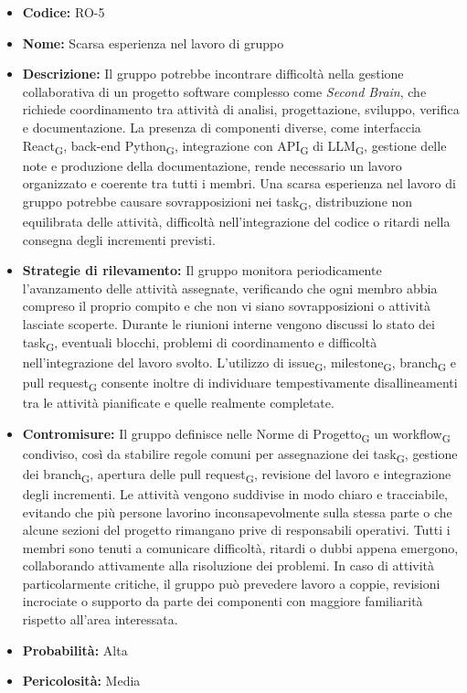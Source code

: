﻿\documentclass[a4paper, 10pt, colorlinks=true, linkcolor=black, urlcolor=blue, citecolor=blue, hidelinks]{article}
\begin{document}
\begin{itemize}
    \item \textbf{Codice:} RO-5

    \item \textbf{Nome:} Scarsa esperienza nel lavoro di gruppo

    \item \textbf{Descrizione:} Il gruppo potrebbe incontrare difficoltà nella gestione collaborativa di un progetto software complesso come \textit{Second Brain}, che richiede coordinamento tra attività di analisi, progettazione, sviluppo, verifica e documentazione. La presenza di componenti diverse, come interfaccia React\textsubscript{G}, back-end Python\textsubscript{G}, integrazione con API\textsubscript{G} di LLM\textsubscript{G}, gestione delle note e produzione della documentazione, rende necessario un lavoro organizzato e coerente tra tutti i membri. Una scarsa esperienza nel lavoro di gruppo potrebbe causare sovrapposizioni nei task\textsubscript{G}, distribuzione non equilibrata delle attività, difficoltà nell'integrazione del codice o ritardi nella consegna degli incrementi previsti.

    \item \textbf{Strategie di rilevamento:} Il gruppo monitora periodicamente l'avanzamento delle attività assegnate, verificando che ogni membro abbia compreso il proprio compito e che non vi siano sovrapposizioni o attività lasciate scoperte. Durante le riunioni interne vengono discussi lo stato dei task\textsubscript{G}, eventuali blocchi, problemi di coordinamento e difficoltà nell'integrazione del lavoro svolto. L'utilizzo di issue\textsubscript{G}, milestone\textsubscript{G}, branch\textsubscript{G} e pull request\textsubscript{G} consente inoltre di individuare tempestivamente disallineamenti tra le attività pianificate e quelle realmente completate.

    \item \textbf{Contromisure:} Il gruppo definisce nelle Norme di Progetto\textsubscript{G} un workflow\textsubscript{G} condiviso, così da stabilire regole comuni per assegnazione dei task\textsubscript{G}, gestione dei branch\textsubscript{G}, apertura delle pull request\textsubscript{G}, revisione del lavoro e integrazione degli incrementi. Le attività vengono suddivise in modo chiaro e tracciabile, evitando che più persone lavorino inconsapevolmente sulla stessa parte o che alcune sezioni del progetto rimangano prive di responsabili operativi. Tutti i membri sono tenuti a comunicare difficoltà, ritardi o dubbi appena emergono, collaborando attivamente alla risoluzione dei problemi. In caso di attività particolarmente critiche, il gruppo può prevedere lavoro a coppie, revisioni incrociate o supporto da parte dei componenti con maggiore familiarità rispetto all'area interessata.

    \item \textbf{Probabilità:} Alta

    \item \textbf{Pericolosità:} Media
\end{itemize}
\end{document}
